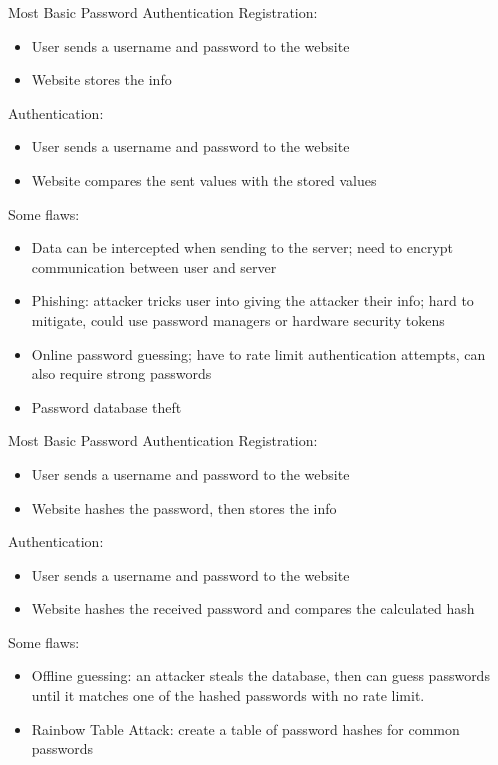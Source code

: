 \documentclass[12pt]{report}
\begin{document}
\begin{exbox}{Most Basic Password Authentication}{}
    Registration:
    \begin{itemize}[noitemsep]
        \item User sends a username and password to the website
        \item Website stores the info
    \end{itemize}
    Authentication:
    \begin{itemize}[noitemsep]
        \item User sends a username and password to the website
        \item Website compares the sent values with the stored values
    \end{itemize}
    \tcblower
    Some flaws:
    \begin{itemize}
        \item Data can be intercepted when sending to the server; need to encrypt communication between user and server
        \item Phishing: attacker tricks user into giving the attacker their info; hard to mitigate, could use password managers or hardware security tokens
        \item Online password guessing; have to rate limit authentication attempts, can also require strong passwords
        \item Password database theft
    \end{itemize}
\end{exbox}


\begin{exbox}{Most Basic Password Authentication}{}
    Registration:
    \begin{itemize}[noitemsep]
        \item User sends a username and password to the website
        \item Website hashes the password, then stores the info
    \end{itemize}
    Authentication:
    \begin{itemize}[noitemsep]
        \item User sends a username and password to the website
        \item Website hashes the received password and compares the calculated hash
    \end{itemize}
    \tcblower
    Some flaws:
    \begin{itemize}
        \item Offline guessing: an attacker steals the database, then can guess passwords until it matches one of the hashed passwords with no rate limit.
        \item Rainbow Table Attack: create a table of password hashes for common passwords
    \end{itemize}
\end{exbox}
\end{document}
